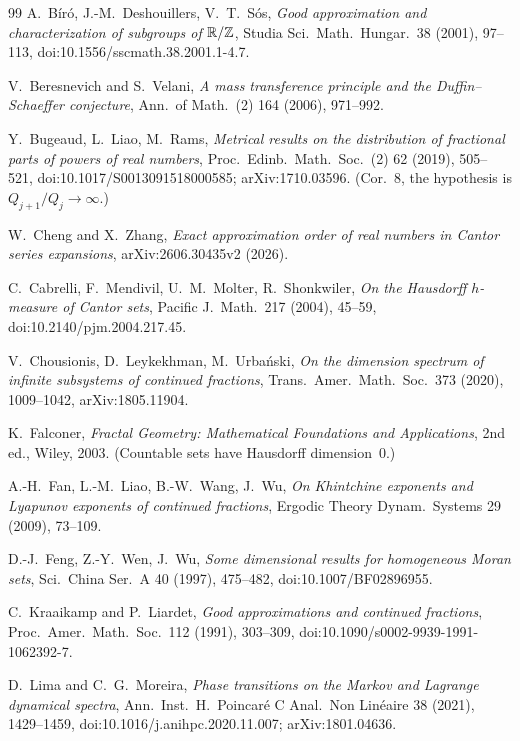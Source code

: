 \begin{thebibliography}{99}
 A.~B\'ir\'o, J.-M.~Deshouillers, V.~T.~S\'os, \emph{Good
approximation and characterization of subgroups of $\mathbb{R}/\mathbb{Z}$}, Studia Sci.\ Math.\ Hungar.\ 38 (2001), 97--113, doi:10.1556/\allowbreak sscmath.38.2001.1-4.7.

 V.~Beresnevich and S.~Velani, \emph{A mass transference principle
and the Duffin--Schaeffer conjecture}, Ann.\ of Math.\ (2) 164 (2006), 971--992.

 Y.~Bugeaud, L.~Liao, M.~Rams, \emph{Metrical results on the
distribution of fractional parts of powers of real numbers}, Proc.\ Edinb.\ Math.\ Soc.\ (2) 62 (2019), 505--521, doi:10.1017/\allowbreak S0013091518000585; arXiv:1710.03596. (Cor.~8, the hypothesis is $Q_{j+1}/Q_j\to\infty$.)

 W.~Cheng and X.~Zhang, \emph{Exact approximation order of real numbers in
Cantor series expansions}, arXiv:2606.30435v2 (2026).

 C.~Cabrelli, F.~Mendivil, U.~M.~Molter, R.~Shonkwiler,
\emph{On the Hausdorff $h$-measure of Cantor sets}, Pacific J.\ Math.\ 217
(2004), 45--59, doi:10.2140/\allowbreak pjm.2004.217.45.

 V.~Chousionis, D.~Leykekhman, M.~Urba\'nski, \emph{On the
dimension spectrum of infinite subsystems of continued fractions}, Trans.\ Amer.\ Math.\ Soc.\ 373 (2020), 1009--1042, arXiv:1805.11904.

 K.~Falconer, \emph{Fractal Geometry: Mathematical
Foundations and Applications}, 2nd ed., Wiley, 2003. (Countable sets have
Hausdorff dimension~$0$.)

 A.-H.~Fan, L.-M.~Liao, B.-W.~Wang, J.~Wu, \emph{On Khintchine
exponents and Lyapunov exponents of continued fractions}, Ergodic Theory Dynam.\ Systems 29 (2009), 73--109.

 D.-J.~Feng, Z.-Y.~Wen, J.~Wu, \emph{Some dimensional results
for homogeneous Moran sets}, Sci.\ China Ser.\ A 40 (1997), 475--482,
doi:10.1007/\allowbreak BF02896955.

 C.~Kraaikamp and P.~Liardet, \emph{Good approximations and
continued fractions}, Proc.\ Amer.\ Math.\ Soc.\ 112 (1991), 303--309, doi:10.1090/\allowbreak s0002-9939-1991-1062392-7.

 D.~Lima and C.~G.~Moreira, \emph{Phase transitions on
the Markov and Lagrange dynamical spectra}, Ann.\ Inst.\ H.~Poincar\'e
C Anal.\ Non Lin\'eaire 38 (2021), 1429--1459,
doi:10.1016/\allowbreak j.anihpc.2020.11.007; arXiv:1801.04636.


\end{thebibliography}
